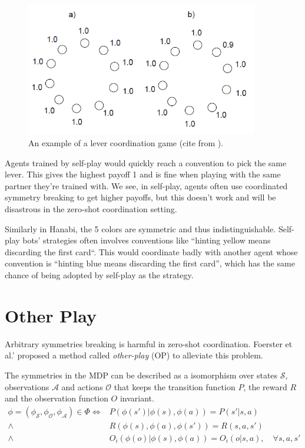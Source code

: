 \documentclass[12pt]{article}
\begin{document}
\begin{spacing}{1.15}
\begin{figure}[H]
\centerline{\includegraphics[width=4in]{fig2.png}}
\caption{An example of a lever coordination game (cite from \cite{hu2020other}).}
\label{Fig2}
\end{figure}

Agents trained by self-play would quickly reach a convention to pick the same lever. This gives the highest payoff 1 and is fine when playing with the same partner they're trained with. We see, in self-play, agents often use coordinated symmetry breaking to get higher payoffs, but this doesn't work and will be disastrous in the zero-shot coordination setting.

Similarly in Hanabi, the 5 colors are symmetric and thus indistinguishable. Self-play bots' strategies often involves conventions like ``hinting yellow means discarding the first card``. This would coordinate badly with another agent whose convention is ``hinting blue means discarding the first card'', which has the same chance of being adopted by self-play as the strategy.

\section{Other Play}
\renewcommand\S{{\mathcal S}}
\renewcommand\O{{\mathcal O}}
\newcommand\A{{\mathcal A}}

Arbitrary symmetries breaking is harmful in zero-shot coordination. Foerster et al.' proposed a method called \textsl{other-play} (OP)\cite{hu2020other} to alleviate this problem.

The symmetries in the MDP can be described as a isomorphism over states $\S$, observations $\A$ and actions $\O$ that keeps the transition function $P$, the reward $R$ and the observation function $O$ invariant.
\begin{align*}
  \phi=(\phi_\S,\phi_\O,\phi_\A)\in\Phi
  \Leftrightarrow{}& P(\phi(s')|\phi(s),\phi(a))=P(s'|s,a) \\
  \wedge~{}& R(\phi(s),\phi(a),\phi(s'))=R(s,a,s') \\
  \wedge~{}& O_i(\phi(o)|\phi(s),\phi(a))=O_i(o|s,a),\quad\forall s,a,s'
\end{align*}


\end{spacing}
\end{document}
